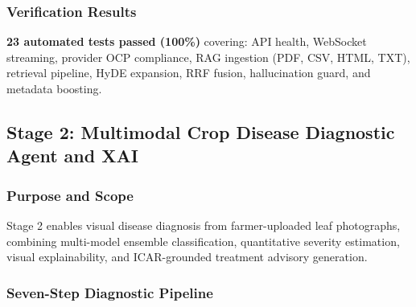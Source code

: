 \documentclass[12pt,a4paper]{article}
\begin{document}
\subsubsection{Verification Results}
\textbf{23 automated tests passed (100\%)} covering: API health, WebSocket streaming, provider OCP compliance, RAG ingestion (PDF, CSV, HTML, TXT), retrieval pipeline, HyDE expansion, RRF fusion, hallucination guard, and metadata boosting.

\subsection{Stage 2: Multimodal Crop Disease Diagnostic Agent and XAI}

\subsubsection{Purpose and Scope}
Stage 2 enables visual disease diagnosis from farmer-uploaded leaf photographs, combining multi-model ensemble classification, quantitative severity estimation, visual explainability, and ICAR-grounded treatment advisory generation.

\subsubsection{Seven-Step Diagnostic Pipeline}
\end{document}
